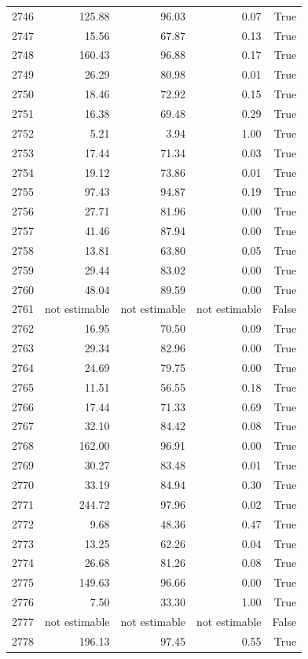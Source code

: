 \begin{longtable}{rrrrr}
2746 & 125.88 & 96.03 & 0.07 & True \\
2747 & 15.56 & 67.87 & 0.13 & True \\
2748 & 160.43 & 96.88 & 0.17 & True \\
2749 & 26.29 & 80.98 & 0.01 & True \\
2750 & 18.46 & 72.92 & 0.15 & True \\
2751 & 16.38 & 69.48 & 0.29 & True \\
2752 & 5.21 & 3.94 & 1.00 & True \\
2753 & 17.44 & 71.34 & 0.03 & True \\
2754 & 19.12 & 73.86 & 0.01 & True \\
2755 & 97.43 & 94.87 & 0.19 & True \\
2756 & 27.71 & 81.96 & 0.00 & True \\
2757 & 41.46 & 87.94 & 0.00 & True \\
2758 & 13.81 & 63.80 & 0.05 & True \\
2759 & 29.44 & 83.02 & 0.00 & True \\
2760 & 48.04 & 89.59 & 0.00 & True \\
2761 & not estimable & not estimable & not estimable & False \\
2762 & 16.95 & 70.50 & 0.09 & True \\
2763 & 29.34 & 82.96 & 0.00 & True \\
2764 & 24.69 & 79.75 & 0.00 & True \\
2765 & 11.51 & 56.55 & 0.18 & True \\
2766 & 17.44 & 71.33 & 0.69 & True \\
2767 & 32.10 & 84.42 & 0.08 & True \\
2768 & 162.00 & 96.91 & 0.00 & True \\
2769 & 30.27 & 83.48 & 0.01 & True \\
2770 & 33.19 & 84.94 & 0.30 & True \\
2771 & 244.72 & 97.96 & 0.02 & True \\
2772 & 9.68 & 48.36 & 0.47 & True \\
2773 & 13.25 & 62.26 & 0.04 & True \\
2774 & 26.68 & 81.26 & 0.08 & True \\
2775 & 149.63 & 96.66 & 0.00 & True \\
2776 & 7.50 & 33.30 & 1.00 & True \\
2777 & not estimable & not estimable & not estimable & False \\
2778 & 196.13 & 97.45 & 0.55 & True \\

\end{longtable}
